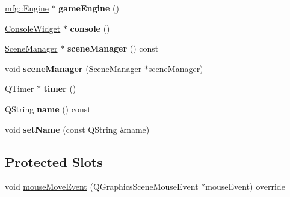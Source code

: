 \begin{DoxyCompactItemize}
\item 
\mbox{\label{class_c_tile_scene_a577377486bf7a95a1f05dcd0b6b73b66}} 
\hyperlink{classmfg_1_1_engine}{mfg\+::\+Engine} $\ast$ {\bfseries game\+Engine} ()
\item 
\mbox{\label{class_c_tile_scene_a2824e9b0dc456cb36fb352d5e1e2bc11}} 
\hyperlink{class_console_widget}{Console\+Widget} $\ast$ {\bfseries console} ()
\item 
\mbox{\label{class_c_tile_scene_a927d805f00a584205fb85ff0ac789159}} 
\hyperlink{class_scene_manager}{Scene\+Manager} $\ast$ {\bfseries scene\+Manager} () const
\item 
\mbox{\label{class_c_tile_scene_a36fa9b189ceb8af34cb56e7511d10cc9}} 
void {\bfseries scene\+Manager} (\hyperlink{class_scene_manager}{Scene\+Manager} $\ast$scene\+Manager)
\item 
\mbox{\label{class_c_tile_scene_a6e7bbbf46ba0599360dcf260c0ea51d6}} 
Q\+Timer $\ast$ {\bfseries timer} ()
\item 
\mbox{\label{class_c_tile_scene_adf402725eafba3102f56798eb5101830}} 
Q\+String {\bfseries name} () const
\item 
\mbox{\label{class_c_tile_scene_af722faee0fb192f315a3b87ca9ae28a1}} 
void {\bfseries set\+Name} (const Q\+String \&name)
\end{DoxyCompactItemize}
\subsection*{Protected Slots}
\begin{DoxyCompactItemize}
\item 
void \hyperlink{class_c_tile_scene_aa1bc804521eaeb9e070c609c3c53f7eb}{mouse\+Move\+Event} (Q\+Graphics\+Scene\+Mouse\+Event $\ast$mouse\+Event) override
\end{DoxyCompactItemize}

